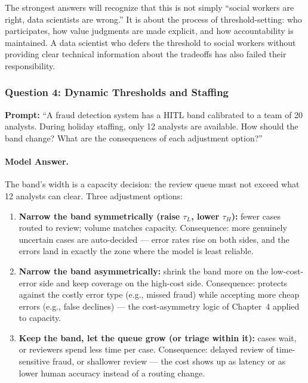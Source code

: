 \begin{keyconcept}
The strongest answers will recognize that this is not simply ``social workers are right, data scientists are wrong.'' It is about the process of threshold-setting: who participates, how value judgments are made explicit, and how accountability is maintained. A data scientist who defers the threshold to social workers without providing clear technical information about the tradeoffs has also failed their responsibility.
\end{keyconcept}

\subsubsection{Question 4: Dynamic Thresholds and Staffing}

\textbf{Prompt:} ``A fraud detection system has a HITL band calibrated to a team of 20 analysts. During holiday staffing, only 12 analysts are available. How should the band change? What are the consequences of each adjustment option?''

\paragraph{Model Answer.}

The band's width is a capacity decision: the review queue must not exceed what 12 analysts can clear. Three adjustment options:

\begin{enumerate}
    \item \textbf{Narrow the band symmetrically (raise $\tau_L$, lower $\tau_H$):} fewer cases routed to review; volume matches capacity. Consequence: more genuinely uncertain cases are auto-decided --- error rates rise on both sides, and the errors land in exactly the zone where the model is least reliable.
    \item \textbf{Narrow the band asymmetrically:} shrink the band more on the low-cost-error side and keep coverage on the high-cost side. Consequence: protects against the costly error type (e.g., missed fraud) while accepting more cheap errors (e.g., false declines) --- the cost-asymmetry logic of Chapter~4 applied to capacity.
    \item \textbf{Keep the band, let the queue grow (or triage within it):} cases wait, or reviewers spend less time per case. Consequence: delayed review of time-sensitive fraud, or shallower review --- the cost shows up as latency or as lower human accuracy instead of a routing change.
\end{enumerate}

